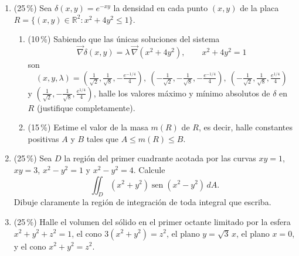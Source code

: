 \documentclass[11pt]{article}
\begin{document}
\begin{enumerate}
\item{} (25\,\%) Sea $\delta(x,y) = e^{-xy}$ la densidad en cada punto $(x,y)$ de la placa $R = \{(x,y) \in \mathbb{R}^2 : x^2 + 4y^2 \leq 1\}$.
\begin{enumerate}[label=(\alph*)]
\item (10\,\%) Sabiendo que las únicas soluciones del sistema
\[
\vec\nabla \delta(x,y) = \lambda\,\vec\nabla(x^2 + 4y^2), \qquad x^2 + 4y^2 = 1
\]
son
\[
(x,y,\lambda) = \left(\tfrac{1}{\sqrt2}, \tfrac{1}{\sqrt8}, -\tfrac{e^{-1/4}}{4}\right),\
\left(-\tfrac{1}{\sqrt2}, -\tfrac{1}{\sqrt8}, -\tfrac{e^{-1/4}}{4}\right),\
\left(-\tfrac{1}{\sqrt2}, \tfrac{1}{\sqrt8}, \tfrac{e^{1/4}}{4}\right)
\]
y $\left(\tfrac{1}{\sqrt2}, -\tfrac{1}{\sqrt8}, \tfrac{e^{1/4}}{4}\right)$, halle los valores máximo y mínimo absolutos de $\delta$ en $R$ (justifique completamente).
\item (15\,\%) Estime el valor de la masa $m(R)$ de $R$, es decir, halle constantes positivas $A$ y $B$ tales que $A \leq m(R) \leq B$.
\end{enumerate}

\item{} (25\,\%) Sea $D$ la región del primer cuadrante acotada por las curvas $xy = 1$, $xy = 3$, $x^2 - y^2 = 1$ y $x^2 - y^2 = 4$. Calcule
\[
\iint_D (x^2 + y^2)\operatorname{sen}(x^2 - y^2)\,dA.
\]
Dibuje claramente la región de integración de toda integral que escriba.

\item{} (25\,\%) Halle el volumen del sólido en el primer octante limitado por la esfera $x^2 + y^2 + z^2 = 1$, el cono $3(x^2 + y^2) = z^2$, el plano $y = \sqrt3\,x$, el plano $x = 0$, y el cono $x^2 + y^2 = z^2$.
\end{enumerate}

\examfooter
\end{document}

